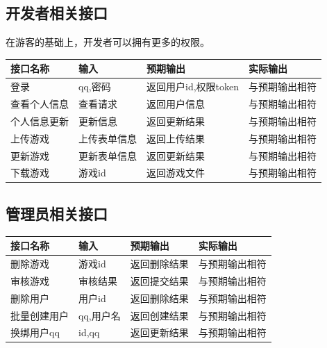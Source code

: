 \documentclass[12pt]{ctexart} %
\begin{document}
\subsection{开发者相关接口}
在游客的基础上，开发者可以拥有更多的权限。
\begin{table}[H]
\centering
\renewcommand{\arraystretch}{1.5} 
\begin{tabular}{|>{\centering\arraybackslash}p{2cm}|>{\raggedright\arraybackslash}p{3cm}|>{\raggedright\arraybackslash}p{4.5cm}|>{\raggedright\arraybackslash}p{5cm}|}
\hline
\textbf{接口名称} & \textbf{输入} & \textbf{预期输出} & \textbf{实际输出} \\
\hline
登录 & qq,密码 & 返回用户id,权限token & 与预期输出相符 \\
\hline
查看个人信息 & 查看请求 & 返回用户信息 & 与预期输出相符 \\
\hline
个人信息更新 & 更新信息 & 返回更新结果 & 与预期输出相符 \\
\hline
上传游戏 & 上传表单信息 & 返回上传结果 & 与预期输出相符 \\
\hline
更新游戏 & 更新表单信息 & 返回更新结果 & 与预期输出相符 \\
\hline
下载游戏 & 游戏id & 返回游戏文件 & 与预期输出相符 \\
\hline
\end{tabular}
\end{table}

\subsection{管理员相关接口}
\begin{table}[H]
\centering
\renewcommand{\arraystretch}{1.5} 
\begin{tabular}{|>{\centering\arraybackslash}p{2cm}|>{\raggedright\arraybackslash}p{3cm}|>{\raggedright\arraybackslash}p{4.5cm}|>{\raggedright\arraybackslash}p{5cm}|}
\hline
\textbf{接口名称} & \textbf{输入} & \textbf{预期输出} & \textbf{实际输出} \\
\hline
删除游戏 & 游戏id & 返回删除结果 & 与预期输出相符 \\
\hline
审核游戏 & 审核结果 & 返回提交结果 & 与预期输出相符 \\
\hline
删除用户 & 用户id & 返回删除结果 & 与预期输出相符 \\
\hline
批量创建用户 & qq,用户名 & 返回创建结果 & 与预期输出相符 \\
\hline
换绑用户qq & id,qq & 返回更新结果 & 与预期输出相符 \\
\hline
\end{tabular}
\end{table}
\end{document}
